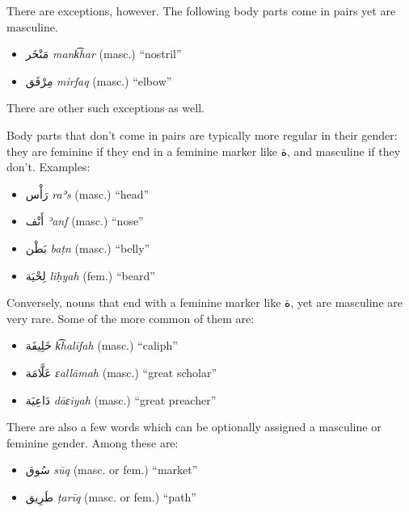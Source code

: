 \documentclass[
  10pt,
]{book}
\providecommand{\tightlist}{%
  \setlength{\itemsep}{0pt}\setlength{\parskip}{0pt}}
\begin{document}
There are exceptions, however. The following body parts come in pairs yet are masculine.

\begin{itemize}
\tightlist
\item
  \foreignlanguage{arabic}{مَنْخَر} \emph{mank͡har} (masc.) \enquote{nostril}
\item
  \foreignlanguage{arabic}{مِرْفَق} \emph{mirfaq} (masc.) \enquote{elbow}
\end{itemize}

There are other such exceptions as well.

Body parts that don't come in pairs are typically more regular in their gender: they are feminine if they end in a feminine marker like \foreignlanguage{arabic}{ة}, and masculine if they don't. Examples:

\begin{itemize}
\tightlist
\item
  \foreignlanguage{arabic}{رَأْس} \emph{raʾs} (masc.) \enquote{head}
\item
  \foreignlanguage{arabic}{أَنْف} \emph{ʾanf} (masc.) \enquote{nose}
\item
  \foreignlanguage{arabic}{بَطْن} \emph{baṭn} (masc.) \enquote{belly}
\item
  \foreignlanguage{arabic}{لِحْيَة} \emph{liḥyah} (fem.) \enquote{beard}
\end{itemize}

Conversely, nouns that end with a feminine marker like \foreignlanguage{arabic}{ة}, yet are masculine are very rare. Some of the more common of them are:

\begin{itemize}
\tightlist
\item
  \foreignlanguage{arabic}{خَلِيفَة} \emph{k͡halīfah} (masc.) \enquote{caliph}
\item
  \foreignlanguage{arabic}{عَلَّامَة} \emph{ɛallāmah} (masc.) \enquote{great scholar}
\item
  \foreignlanguage{arabic}{دَاعِيَة} \emph{dāɛiyah} (masc.) \enquote{great preacher}
\end{itemize}

There are also a few words which can be optionally assigned a masculine or feminine gender. Among these are:

\begin{itemize}
\tightlist
\item
  \foreignlanguage{arabic}{سُوق} \emph{sūq} (masc. or fem.) \enquote{market}
\item
  \foreignlanguage{arabic}{طَرِيق} \emph{ṭarīq} (masc. or fem.) \enquote{path}
\end{itemize}
\end{document}
